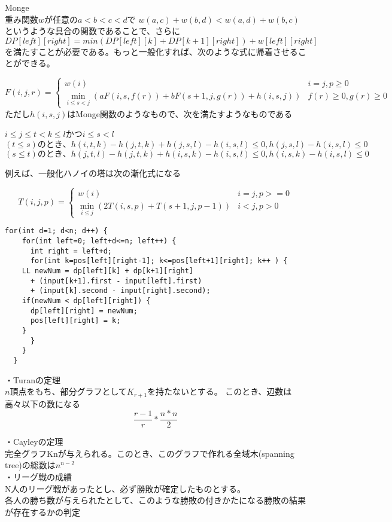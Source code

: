 Monge \\
重み関数$w$が任意の$a<b<c<d$で $w(a,c)+w(b,d)<w(a,d)+w(b,c)$というような具合の関数であることで、さらに$DP[left][right] = min(DP[left][k] + DP[k+1][right])+w[left][right]$を満たすことが必要である。もっと一般化すれば、次のような式に帰着させることができる。

\[
F(i,j,r) = \begin{cases}
  w(i) & i=j , p \geq 0 \\
  \min_{i \leq s <j} ( aF(i,s,f(r)) + bF(s+1,j,g(r)) +h(i,s,j) ) & f(r) \geq 0 , g(r) \geq 0
\end{cases} \]
 ただし$h(i,s,j)$はMonge関数のようなもので、次を満たすようなものである

$i \leq j \leq t < k \leq l$かつ$i \leq s < l$
\[
(t\leq s)のとき、 h(i,t,k) - h(j,t,k) + h(j,s,l) - h(i,s,l) \leq 0 , h(j,s,l) - h(i,s,l) \leq 0 \]
\[
(s \leq t)のとき、h(j,t,l) - h(j,t,k) + h(i,s,k) - h(i,s,l) \leq 0, h(i,s,k) - h(i,s,l) \leq 0 \]



例えば、一般化ハノイの塔は次の漸化式になる

\[
T(i,j,p) = \begin{cases}
w(i) & i=j , p>=0  \\
\min_{i \leq j}(2T(i,s,p) + T(s+1,j,p-1)) & i<j, p>0

\end{cases} \]
\begin{lstlisting}[caption=MongeDP]
  for(int d=1; d<n; d++) {
    for(int left=0; left+d<=n; left++) {
      int right = left+d;
      for(int k=pos[left][right-1]; k<=pos[left+1][right]; k++ ) {
	LL newNum = dp[left][k] + dp[k+1][right]
	  + (input[k+1].first - input[left].first)
	  + (input[k].second - input[right].second);
	if(newNum < dp[left][right]) {
	  dp[left][right] = newNum;
	  pos[left][right] = k;	  
	}
      }
    }
  } 
\end{lstlisting}


・Turanの定理\\
$n$頂点をもち、部分グラフとして$K_{r+1}$を持たないとする。
このとき、辺数は高々以下の数になる
\[\frac{r-1}{r} * \frac{n*n}{2}\]

・Cayleyの定理\\
完全グラフKnが与えられる。このとき、このグラフで作れる全域木(spanning tree)の総数は$n^{n-2}$\\

・リーグ戦の成績\\
N人のリーグ戦があったとし、必ず勝敗が確定したものとする。\\
各人の勝ち数が与えられたとして、このような勝敗の付きかたになる勝敗の結果が存在するかの判定\\

